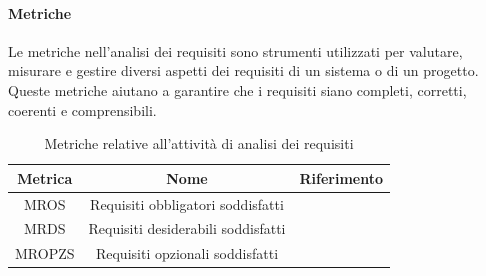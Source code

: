 \paragraph{Metriche}
Le metriche nell'analisi dei requisiti sono strumenti utilizzati per valutare, misurare e gestire diversi aspetti dei requisiti di un sistema o di un progetto. Queste metriche aiutano a garantire che i requisiti siano completi, corretti, coerenti e comprensibili.
\begin{table}[h]
    \centering
    \begin{tabular}{|c|c|c|}
    \hline
    Metrica & Nome & Riferimento \\
    \hline \hline
    MROS & Requisiti obbligatori soddisfatti &  \\
    MRDS & Requisiti desiderabili soddisfatti &  \\
    MROPZS & Requisiti opzionali soddisfatti & \\
    \hline
    \end{tabular}
    \caption{Metriche relative all'attività di analisi dei requisiti}
\end{table}

